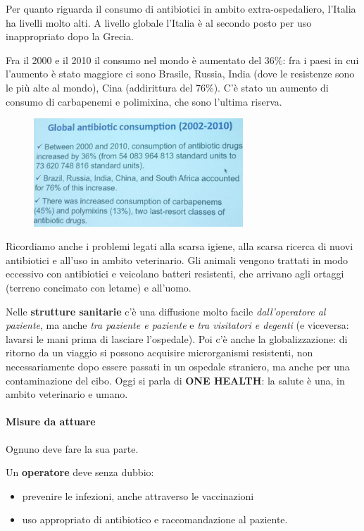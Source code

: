 Per quanto riguarda il consumo di antibiotici in ambito
extra-ospedaliero, l'Italia ha livelli molto alti. A livello globale
l'Italia è al secondo posto per uso inappropriato dopo la Grecia.

Fra il 2000 e il 2010 il consumo nel mondo è aumentato del 36\%: fra i
paesi in cui l'aumento è stato maggiore ci sono Brasile, Russia, India
(dove le resistenze sono le più alte al mondo), Cina (addirittura del
76\%). C'è stato un aumento di consumo di carbapenemi e polimixina, che
sono l'ultima riserva.

\begin{figure}[!ht]
\centering
	\includegraphics[width=0.7\textwidth]{19/image10.jpeg}
	\end{figure}

Ricordiamo
anche i problemi legati alla scarsa igiene, alla scarsa ricerca di nuovi
antibiotici e all'uso in ambito veterinario. Gli animali vengono
trattati in modo eccessivo con antibiotici e veicolano batteri
resistenti, che arrivano agli ortaggi (terreno concimato con letame) e
all'uomo.

Nelle \textbf{strutture sanitarie} c'è una diffusione molto facile
\emph{dall'operatore al paziente}, ma anche \emph{tra paziente e
paziente} e \emph{tra visitatori e degenti} (e viceversa: lavarsi le
mani prima di lasciare l'ospedale). Poi c'è anche la globalizzazione: di
ritorno da un viaggio si possono acquisire microrganismi resistenti, non
necessariamente dopo essere passati in un ospedale straniero, ma anche
per una contaminazione del cibo. Oggi si parla di \textbf{ONE HEALTH}:
la salute è una, in ambito veterinario e umano.

\paragraph{Misure da attuare}

Ognuno deve fare la sua parte. 

Un \textbf{operatore} deve senza dubbio:
\begin{itemize}
\item prevenire le infezioni, anche attraverso le vaccinazioni
\item uso appropriato di antibiotico e raccomandazione al paziente.
\end{itemize}

